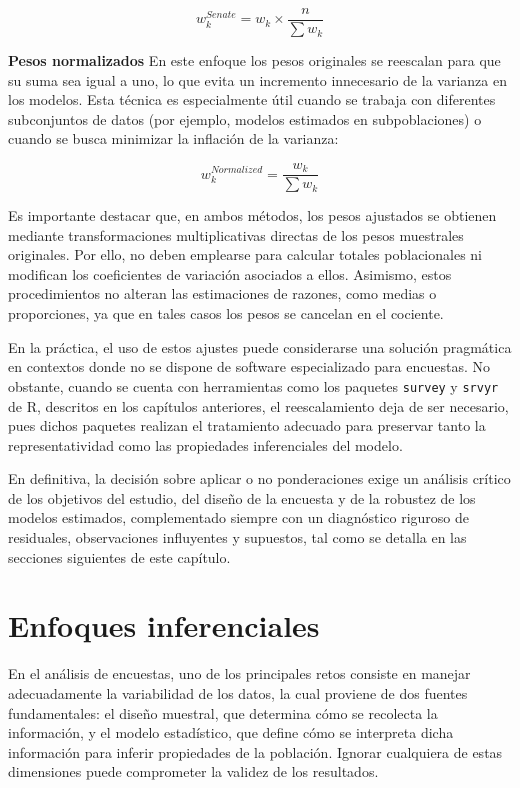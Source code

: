 \documentclass[
  spanish,
  12pt,
]{book}
\begin{document}
\[
w_k^{Senate} = w_k \times \frac{n}{\sum w_k}
\]

\textbf{Pesos normalizados}
En este enfoque los pesos originales se reescalan para que su suma sea igual a uno, lo que evita un incremento innecesario de la varianza en los modelos. Esta técnica es especialmente útil cuando se trabaja con diferentes subconjuntos de datos (por ejemplo, modelos estimados en subpoblaciones) o cuando se busca minimizar la inflación de la varianza:

\[
w_k^{Normalized} = \frac{w_k}{\sum w_k}
\]

Es importante destacar que, en ambos métodos, los pesos ajustados se obtienen mediante transformaciones multiplicativas directas de los pesos muestrales originales. Por ello, no deben emplearse para calcular totales poblacionales ni modifican los coeficientes de variación asociados a ellos. Asimismo, estos procedimientos no alteran las estimaciones de razones, como medias o proporciones, ya que en tales casos los pesos se cancelan en el cociente.

En la práctica, el uso de estos ajustes puede considerarse una solución pragmática en contextos donde no se dispone de software especializado para encuestas. No obstante, cuando se cuenta con herramientas como los paquetes \texttt{survey} y \texttt{srvyr} de R, descritos en los capítulos anteriores, el reescalamiento deja de ser necesario, pues dichos paquetes realizan el tratamiento adecuado para preservar tanto la representatividad como las propiedades inferenciales del modelo.

En definitiva, la decisión sobre aplicar o no ponderaciones exige un análisis crítico de los objetivos del estudio, del diseño de la encuesta y de la robustez de los modelos estimados, complementado siempre con un diagnóstico riguroso de residuales, observaciones influyentes y supuestos, tal como se detalla en las secciones siguientes de este capítulo.

\section{Enfoques inferenciales}\label{enfoques-inferenciales}

En el análisis de encuestas, uno de los principales retos consiste en manejar adecuadamente la variabilidad de los datos, la cual proviene de dos fuentes fundamentales: el diseño muestral, que determina cómo se recolecta la información, y el modelo estadístico, que define cómo se interpreta dicha información para inferir propiedades de la población. Ignorar cualquiera de estas dimensiones puede comprometer la validez de los resultados.
\end{document}
